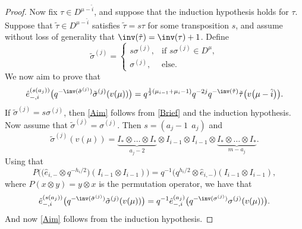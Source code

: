 \begin{proof}
Now fix $\tau \in D^{\mu - \hat{i}}$, and suppose that the induction hypothesis holds for $\tau$. Suppose that $\tilde{\tau} \in D^{\mu - \hat{i}}$ satisfies $\tilde{\tau}=s\tau$ for some transposition $s$, and assume without loss of generality that $\inv(\tilde{\tau}) = \inv(\tau) + 1$. Define
\[
\tilde{\sigma}^{(j)}
=
\begin{cases}
s \sigma^{(j)}, & \text{if } s \sigma^{(j)} \in D^{\mu}, \\
\sigma^{(j)}, & \text{else. }
\end{cases}
\]
We now aim to prove that
\begin{equation}\label{Aim}
\hat{e}^{(s(a_j))}_{-,i}\big(q^{-\inv(\tilde{\sigma}^{(j)})} \tilde{\sigma}^{(j)}(v(\mu)) \big) = q^{\frac{1}{2}(\mu_{i-1}+\mu_i-1)} q^{-2j} q^{-\inv(\tilde{\tau})} \tilde{\tau}\big(v\big(\mu- \hat{i}\big)\big).
\end{equation}
If $\tilde{\sigma}^{(j)} = s\sigma^{(j)}$, then \eqref{Aim} follows from \eqref{Brief} and the induction hypothesis. Now assume that $\tilde{\sigma}^{(j)} = \sigma^{(j)}$. Then $s= (a_j-1 \ \ a_j)$ and
\[
\tilde{\sigma}^{(j)} ( v(\mu) ) = \underbrace{I_* \otimes \dots \otimes I_* }_{a_j-2} \otimes I_{i-1} \otimes I_{i-1} \otimes \underbrace{I_* \otimes \dots \otimes I_*}_{m-a_j}.
\]
Using that
\[
 P \big( \big(\hat{e}_{i,-} \otimes q^{-h_i/2}\big)(I_{i-1} \otimes I_{i-1}) \big) = q^{-1}\big(q^{h_i/2} \otimes \hat{e}_{i,-}\big)(I_{i-1} \otimes I_{i-1}) ,
\]
where $P(x\otimes y)=y\otimes x$ is the permutation operator, we have that
\[
\hat{e}^{(s(a_j))}_{-,i}\big(q^{-\inv(\tilde{\sigma}^{(j)})} \tilde{\sigma}^{(j)}(v(\mu)) \big) = q^{-1}\hat{e}^{(a_j)}_{-,i}\big(q^{-\inv({\sigma}^{(j)})} {\sigma}^{(j)}(v(\mu)) \big).
\]
And now \eqref{Aim} follows from the induction hypothesis.
\end{proof}
